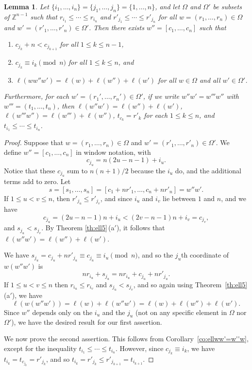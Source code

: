 \documentclass[12pt]{amsart}
\renewcommand{\le}{\leqslant}
\newcommand{\bZ}{{\mathbb{Z}}}
\numberwithin{equation}{section}
\newtheorem{lemma}[equation]{Lemma}
\theoremstyle{definition}
\begin{document}
\begin{lemma}\label{le:Aw''B} 
Let $\{i_1,\dots,i_n\}=\{j_1,\dots,j_n\}=\{1,\dots,n\}$, and 
let $\Omega$ and $\Omega'$ be subsets of $\bZ^{n-1}$ such that 
$r_{i_1}\le\cdots\le r_{i_n}$ and
$r'_{j_1}\le\cdots\le r'_{j_n}$ for all
$w=(r_1,\dots,r_n)\in\Omega$ 
and $w'=(r'_1,\dots,r'_n)\in\Omega'$.
Then there exists $w''=[c_1,\ldots,c_n]$ such that
\begin{enumerate}
\item
  $c_{j_k}+n<c_{j_{k+1}}$ for all $1\le k\le n-1$, 
\item
$c_{j_k}\equiv
  i_k\pmod n$ for all $1\le k\le n$, and
\item
  $\ell(ww''w')=\ell(w)+\ell(w'')+\ell(w')$ for all $w\in \Omega$ and
  all $w'\in \Omega'$. 
\end{enumerate}
Furthermore, for each $w'=(r_1',\ldots,r_n')\in\Omega'$, 
if we write $w''w'=w'''w''$ with $w'''=(t_1,\ldots,t_n)$, 
then $\ell(w''w')=\ell(w'')+\ell(w')$,
$\ell(w'''w'')=\ell(w''')+\ell(w'')$, $t_{c_k}=r'_k$ for
each $1\le k\le n$, and $t_{i_1}\le \cdots\le t_{i_n}$.
\end{lemma}
\begin{proof} 
Suppose that
$w=(r_1,\ldots,r_n)\in \Omega$ and $w'=(r'_1,\ldots,r'_n)\in \Omega'$. We define
$w''=[c_1,\ldots,c_n]$ in window notation, with 
\[ c_{j_u}=n(2u-n-1)+i_u. \]
Notice that these $c_{j_u}$ sum to $n(n+1)/2$ because the $i_u$ do,
and the additional terms add to zero. 
Let 
\[ s=[s_1,\ldots,s_n]=[c_1+nr'_1,\ldots,c_n+nr'_n]=w''w'. \]
If $1\le
u<v\le n$, then $r'_{j_u}\le r'_{j_v}$, and since $i_u$ and $i_v$ lie
between $1$ and $n$, and we have
\[ c_{j_u}=(2u-n-1)n+i_u<(2v-n-1)n+i_v=c_{j_v},\] 
and $s_{j_u}<s_{j_v}$.
By Theorem
\ref{th:ell5}\,(a$'$), it follows that $\ell(w''w')=\ell(w'')+\ell(w')$. 

We have $s_{j_u}=c_{j_u}+nr'_{j_u}\equiv c_{j_u}\equiv i_u \pmod{n}$,
and so the $j_u$th coordinate of $w(w''w')$ is 
\[ nr_{i_u}+s_{j_u}=nr_{i_u}+c_{j_u}+nr'_{j_u}. \]
If $1\le u< v\le n$ then $r_{i_u}\le r_{i_v}$ and $s_{j_u}<s_{j_v}$, and
so again using Theorem~\ref{th:ell5}\,(a$'$), we have
\[ \ell(w(w''w'))=\ell(w)+\ell(w''w')=\ell(w)+\ell(w'')+\ell(w'). \] 
Since $w''$ depends only on the $i_u$ and the $j_u$ (not on any
specific element 
in $\Omega$ nor $\Omega'$), we have the desired result for our first
assertion.  

We now prove the second assertion. This follows from
Corollary~\ref{co:ellww'=w''w}, except for 
  the inequality $t_{i_1}\le \cdots\le t_{i_n}$. However, since
  $c_{j_k}\equiv i_k$, we 
  have $t_{i_k}=t_{c_{j_k}}=r'_{j_k}$, and so $t_{i_k}=r'_{j_k}\le
  r'_{j_{k+1}}=t_{i_{k+1}}$. 
\end{proof}
\end{document}
